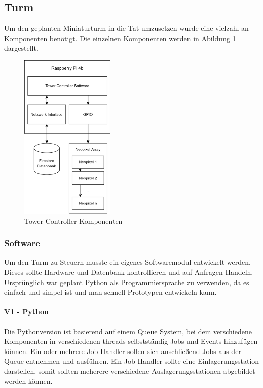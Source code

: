 \subsection{Turm}

Um den geplanten Miniaturturm in die Tat umzusetzen wurde eine vielzahl an Komponenten benötigt. Die einzelnen Komponenten werden in Abildung \ref{fig:tower_controller_components} dargestellt.

\begin{figure}[ht]
  \centering
  \includegraphics[width=0.4\textwidth]{images/tower_controller_components.png}
  \caption{Tower Controller Komponenten}
  \label{fig:tower_controller_components}
\end{figure}

\subsubsection{Software}

Um den Turm zu Steuern musste ein eigenes Softwaremodul entwickelt werden. Dieses sollte Hardware und Datenbank kontrollieren und auf Anfragen Handeln. Ursprünglich war geplant Python als Programmiersprache zu verwenden, da es einfach und simpel ist und man schnell Prototypen entwickeln kann.


\paragraph{V1 - Python}
Die Pythonversion ist basierend auf einem Queue System, bei dem verschiedene Komponenten in verschiedenen \Glspl{thread} selbstständig Jobs und Events hinzufügen können. Ein oder mehrere Job-Handler sollen sich anschließend Jobs aus der Queue entnehmen und ausführen. Ein Job-Handler sollte eine Einlagerungsstation darstellen, somit sollten meherere verschiedene Auslagerungsstationen abgebildet werden können.

